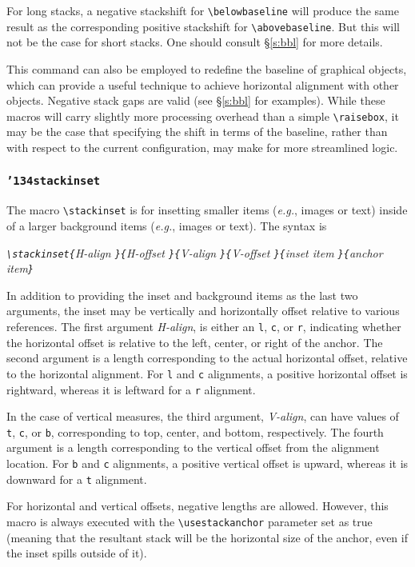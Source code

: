 \documentclass{article}
\let\vb\verb
\newcommand\cmd[1]{\texttt{\char'134#1}}
\begin{document}
For long stacks, a negative stackshift for \vb|\belowbaseline| will
produce the same result as the corresponding positive stackshift for
\vb|\abovebaseline|.  But this will not be the case for short stacks.
One should consult \S\ref{s:bbl} for more details.

This command can also be employed to redefine the baseline of graphical
objects, which can provide a useful technique to achieve horizontal
alignment with other objects.  Negative stack gaps are valid (see
\S\ref{s:bbl} for examples).  While these macros will carry slightly 
more processing overhead than a simple \vb|\raisebox|, it may be the 
case that specifying the shift in terms of the baseline, rather than 
with respect to the current configuration, may make for more 
streamlined logic.

\subsubsection{\cmd{stackinset}\label{s:iis}}

The macro \vb|\stackinset| is for insetting
smaller items (\textit{e.g.}, images or text) inside of a larger background
items (\textit{e.g.}, images or text).  The syntax is

\itshape
\vb|\stackinset{|H-align%
  \vb|}{|H-offset%
  \vb|}{|V-align%
  \vb|}{|V-offset%
  \vb|}{|inset item%
  \vb|}{|anchor item\vb|}|
\upshape

In addition to providing the inset and background items as the last two
arguments, the inset may be vertically and horizontally offset relative
to various references.  The first argument \textit{H-align}, is either
an \vb|l|, \vb|c|, or \vb|r|, indicating whether the horizontal offset
is relative to the left, center, or right of the anchor.  The second
argument is a length corresponding to the actual horizontal offset, 
relative to the horizontal alignment.  For \vb|l| and \vb|c| alignments, 
a positive horizontal offset is rightward, whereas it is leftward for
a \vb|r| alignment.

In the case of vertical measures, the third argument, \textit{V-align}, 
can have values of \vb|t|, \vb|c|, or \vb|b|, corresponding to top,
center, and bottom, respectively.  The fourth argument is a length
corresponding to the vertical offset from the alignment location.
For \vb|b| and \vb|c| alignments, a positive vertical offset is upward,
whereas it is downward for a \vb|t| alignment.

For horizontal and vertical offsets, negative lengths are allowed.
However, this macro is always executed with the \vb|\usestackanchor| 
parameter set as true (meaning that the resultant stack will be the
horizontal size of the anchor, even if the inset spills outside of it).
\end{document}
